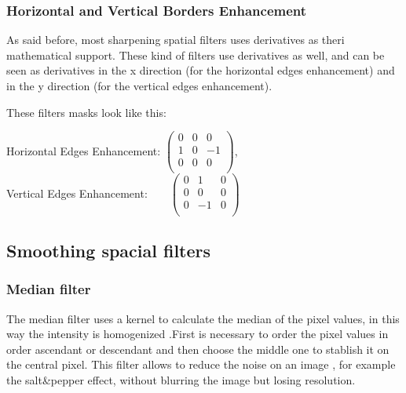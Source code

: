 \documentclass[a4paper]{article}
\begin{document}
\subsubsection{Horizontal and Vertical Borders Enhancement}

As said before, most sharpening spatial filters uses derivatives as theri mathematical support. These kind of filters use derivatives as well, and can be seen as derivatives in the x direction (for the horizontal edges enhancement) and in the y direction (for the vertical edges enhancement).

These filters masks look like this:\\
\begin{center}
	Horizontal Edges Enhancement: 
 \begin{math}
   \begin{pmatrix} 
   0 & 0 & 0 \\ 
   1 & 0 & -1 \\
   0 & 0 & 0 \\ 
   \end{pmatrix}
\end{math},  \\ Vertical  Edges Enhancement:\ \ \ \  \begin{math}
   \begin{pmatrix} 
   0 & 1 & 0 \\ 
   0 & 0 & 0 \\
   0 & -1 & 0 \\ 
   \end{pmatrix}
\end{math}\\
\end{center}

\subsection{Smoothing spacial filters}

\subsubsection{Median filter}

The median filter uses a kernel to calculate the median of the pixel values, in this way the intensity is homogenized .First is necessary to order the pixel values in order ascendant or descendant and then choose the middle one to stablish it on the central pixel.
This filter allows to reduce the noise on an image , for example the salt\&pepper effect, without blurring the image but losing resolution.
\end{document}

